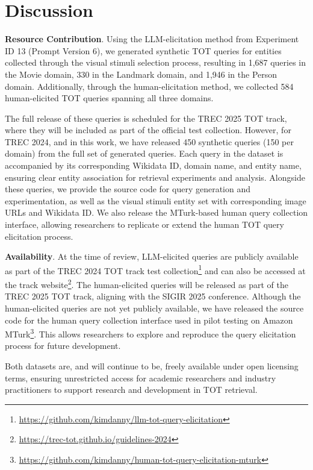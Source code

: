 \section{Discussion}\label{sec:resource}


\textbf{Resource Contribution}.
Using the LLM-elicitation method from Experiment ID 13 (Prompt Version 6), we generated synthetic TOT queries for entities collected through the visual stimuli selection process, resulting in 1,687 queries in the Movie domain, 330 in the Landmark domain, and 1,946 in the Person domain. Additionally, through the human-elicitation method, we collected 584 human-elicited TOT queries spanning all three domains.


The full release of these queries is scheduled for the TREC 2025 TOT track, where they will be included as part of the official test collection. However, for TREC 2024, and in this work, we have released 450 synthetic queries (150 per domain) from the full set of generated queries. Each query in the dataset is accompanied by its corresponding Wikidata ID, domain name, and entity name, ensuring clear entity association for retrieval experiments and analysis. Alongside these queries, we provide the source code for query generation and experimentation, as well as the visual stimuli entity set with corresponding image URLs and Wikidata ID. We also release the MTurk-based human query collection interface, allowing researchers to replicate or extend the human TOT query elicitation process.



\textbf{Availability}.
At the time of review, LLM-elicited queries are publicly available as part of the TREC 2024 TOT track test collection\footnote{\url{https://github.com/kimdanny/llm-tot-query-elicitation}} and can also be accessed at the track website\footnote{\url{https://trec-tot.github.io/guidelines-2024}}. The human-elicited queries will be released as part of the TREC 2025 TOT track, aligning with the SIGIR 2025 conference.
%
Although the human-elicited queries are not yet publicly available, we have released the source code for the human query collection interface used in pilot testing on Amazon MTurk\footnote{\url{https://github.com/kimdanny/human-tot-query-elicitation-mturk}}. This allows researchers to explore and reproduce the query elicitation process for future development.

Both datasets are, and will continue to be, freely available under open licensing terms, ensuring unrestricted access for academic researchers and industry practitioners to support research and development in TOT retrieval.



